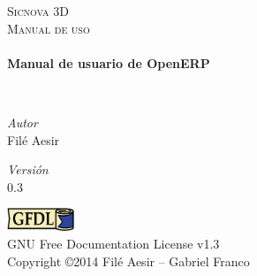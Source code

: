 \begin{titlepage}
\begin{center}

\vspace*{5cm}
\textsc{\LARGE Sicnova 3D}\\[1.5cm]

\textsc{\Large Manual de uso}\\[0.5cm]

\HRule \\[0.4cm]
{ \huge \bfseries Manual de usuario de OpenERP \\[0.4cm] }

\HRule \\[1.5cm]

\noindent
\vfill
\begin{minipage}{0.4\textwidth}
\begin{flushleft} \large
\emph{Autor}\\
Filé Aesir
\end{flushleft}
\end{minipage}%
\begin{minipage}{0.4\textwidth}
\begin{flushright} \large
\emph{Versión} \\
0.3
\end{flushright}
\end{minipage}
\vspace{2cm}


\includegraphics[width=2cm]{GFDL.png}\\
GNU Free Documentation License v1.3\\
Copyright \copyright 2014 Filé Aesir -- Gabriel Franco

\end{center}
\end{titlepage}
